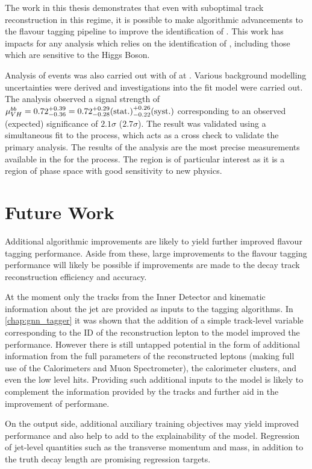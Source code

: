 The work in this thesis demonstrates that even with suboptimal track reconstruction in this regime, it is possible to make algorithmic advancements to the flavour tagging pipeline to improve the identification of \bjets.
This work has impacts for any analysis which relies on the identification of \bjets, including those which are sensitive to the Higgs Boson.

Analysis of \VHbb events was also carried out with \intlumi of \runtwo \ATLAS at .
Various background modelling uncertainties were derived and investigations into the fit model were carried out.
The analysis observed a signal strength of 
$\mu_{VH}^{bb} = 0.72 ^{+0.39}_{-0.36} = 0.72 ^{+0.29}_{-0.28} \mathrm{(stat.)} ^{+0.26}_{-0.22} \mathrm{(syst.)}$
corresponding to an observed (expected) significance of $2.1\sigma$ ($2.7\sigma$).
The result was validated using a simultaneous fit to the \VZbb process, which acts as a cross check to validate the primary analysis.
The results of the analysis are the most precise measurements available in the \highpt for the \VHbb process.
The \highpt region is of particular interest as it is a region of phase space with good sensitivity to new physics.


\section{Future Work}\label{sec:conc-future}

Additional algorithmic improvements are likely to yield further improved flavour tagging performance.
Aside from these, large improvements to the flavour tagging performance will likely be possible if improvements are made to the \bhadron decay track reconstruction efficiency and accuracy.

At the moment only the tracks from the Inner Detector and kinematic information about the jet are provided as inputs to the tagging algorithms.
In \cref{chap:gnn_tagger} it was shown that the addition of a simple track-level variable corresponding to the ID of the reconstruction lepton to the model improved the performance.
However there is still untapped potential in the form of additional information from the full parameters of the reconstructed leptons (making full use of the Calorimeters and Muon Spectrometer), the calorimeter clusters, and even the low level hits.
Providing such additional inputs to the model is likely to complement the information provided by the tracks and further aid in the improvement of performane.

On the output side, additional auxiliary training objectives may yield improved performance and also help to add to the explainability of the model.
Regression of jet-level quantities such as the transverse momentum and mass, in addition to the truth \bhadron decay length are promising regression targets.

